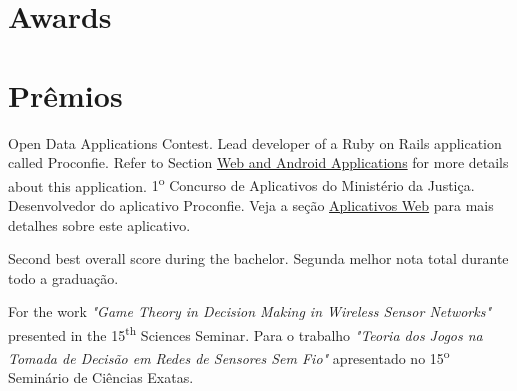  {\section{Awards}\label{sec:awards}}{\section{Prêmios}\label{sec:awards}}

	{
		{Open Data Applications Contest. Lead developer of a Ruby on Rails application called Proconfie. Refer to Section \hyperref[sec:web_app]{Web and Android Applications} for more details about this application.}
		{1\textsuperscript{o} Concurso de Aplicativos do Ministério da Justiça. Desenvolvedor do aplicativo Proconfie. Veja a seção \hyperref[sec:web_app]{Aplicativos Web} para mais detalhes sobre este aplicativo.}}

	{
		        {Second best overall score during the bachelor.}
		        {Segunda melhor nota total durante todo a graduação.}}

	{
		{For the work \emph{"Game Theory in Decision Making in Wireless Sensor Networks"} presented in the 15\textsuperscript{th} Sciences Seminar.}
		{Para o trabalho \emph{"Teoria dos Jogos na Tomada de Decisão em Redes de Sensores Sem Fio"} apresentado no 15\textsuperscript{o} Seminário de Ciências Exatas.}}



